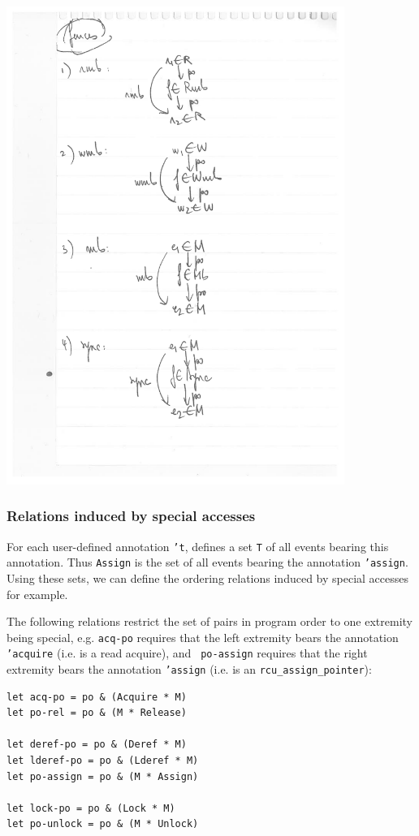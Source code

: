 \documentclass[a4paper]{article}
\begin{document}
\includegraphics[width=11cm]{fences}

\pagebreak

\subsubsection{Relations induced by special accesses}

For each user-defined annotation {\tt 't},  defines a set {\tt T} of
all events bearing this annotation. Thus {\tt Assign} is the set of all events
bearing the annotation {\tt 'assign}. Using these sets, we can define the
ordering relations induced by special accesses for example. 

The following relations restrict the set of pairs in program order to one
extremity being special, e.g. {\tt acq-po} requires that the left extremity
bears the annotation {\tt 'acquire} (i.e. is a read acquire), and {\tt
po-assign} requires that the right extremity bears the annotation {\tt 'assign}
(i.e. is an {\tt rcu\_assign\_pointer}):
\begin{verbatim}
let acq-po = po & (Acquire * M)
let po-rel = po & (M * Release)

let deref-po = po & (Deref * M)
let lderef-po = po & (Lderef * M)
let po-assign = po & (M * Assign)

let lock-po = po & (Lock * M)
let po-unlock = po & (M * Unlock)
\end{verbatim}
\end{document}
